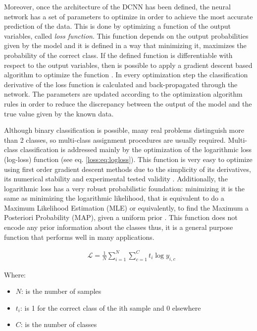 Moreover, once the architecture of the DCNN has been defined, the neural network has a set of parameters to optimize in order to achieve the most accurate prediction of the data. This is done by optimizing a function of the output variables, called \textit{loss function}. This function depends on the output probabilities given by the model and it is defined in a way that minimizing it, maximizes the probability of the correct class. If the defined function is differentiable with respect to the output variables, then is possible to apply a gradient descent based algorithm to optimize the function \citep{saad1998online}. In every optimization step the classification derivative of the loss function is calculated and back-propagated through the network. The parameters are updated according to the optimization algorithm rules in order to reduce the discrepancy between the output of the model and the true value given by the known data.

Although binary classification is possible, many real problems distinguish more than 2 classes, so multi-class assignment procedures are usually required.
Multi-class classification is addressed mainly by the optimization of the logarithmic loss (log-loss) function (see eq. \ref{loss:eq:logloss}). This function is very easy to optimize using first order gradient descent methods due to the simplicity of its derivatives, its numerical stability and experimental tested validity \citep{Goodfellow-et-al-2016}. Additionally, the logarithmic loss has a very robust probabilistic foundation: minimizing it is the same as minimizing the logarithmic likelihood, that is equivalent to do a Maximum Likelihood Estimation (MLE) or equivalently, to find the Maximum a Posteriori Probability (MAP), given a uniform prior \citep{Murphy:2012:MLP:2380985}. This function does not encode any prior information about the classes thus, it is a general purpose function that performs well in many applications. 

\begin{equation}
\label{loss:eq:logloss}
\begin{aligned}
&\mathcal{L} = \frac{1}{N} \sum_{i=1}^N \sum_{c=1}^C t_i \log{y_{i,c}}
\end{aligned}
\end{equation}

Where:
\begin{itemize}
	\item[] $N$: is the number of samples
	\item[] $t_i$: is 1 for the correct class of the ith sample and 0 elsewhere
	\item[] $C$: is the number of classes
\end{itemize}

